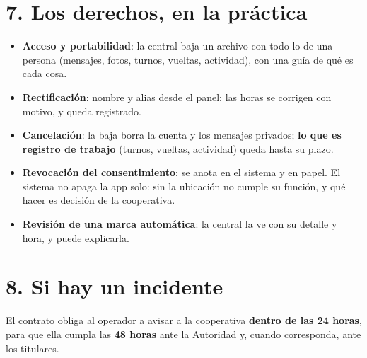 \documentclass[10.5pt,a4paper]{article}
\begin{document}
\section{7. Los derechos, en la práctica}
\begin{itemize}[leftmargin=14pt]
\item \textbf{Acceso y portabilidad}: la central baja un archivo con todo lo de
  una persona (mensajes, fotos, turnos, vueltas, actividad), con una guía de
  qué es cada cosa.
\item \textbf{Rectificación}: nombre y alias desde el panel; las horas se
  corrigen con motivo, y queda registrado.
\item \textbf{Cancelación}: la baja borra la cuenta y los mensajes privados;
  \textbf{lo que es registro de trabajo} (turnos, vueltas, actividad) queda
  hasta su plazo.
\item \textbf{Revocación del consentimiento}: se anota en el sistema y en papel.
  El sistema no apaga la app solo: sin la ubicación no cumple su función, y
  qué hacer es decisión de la cooperativa.
\item \textbf{Revisión de una marca automática}: la central la ve con su
  detalle y hora, y puede explicarla.
\end{itemize}

\section{8. Si hay un incidente}
El contrato obliga al operador a avisar a la cooperativa \textbf{dentro de las
24 horas}, para que ella cumpla las \textbf{48 horas} ante la Autoridad y,
cuando corresponda, ante los titulares.
\end{document}
